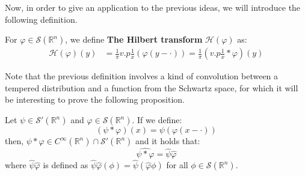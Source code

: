Now, in order to give an application to the previous ideas, we will introduce the following definition.
\begin{definition}{}
  For $\varphi\in\mathcal{S}(\mathbb{R}^n)$, we define \textbf{The Hilbert transform} $\mathcal{H}(\varphi)$ as:
  \begin{align*}
    \mathcal{H}(\varphi)(y)&=\frac{1}{\pi}v.p\frac{1}{x}(\varphi(y-\cdot))=\frac{1}{\pi}(v.p\frac{1}{x}*\varphi)(y)
  \end{align*}
\end{definition}
Note that the previous definition involves a kind of convolution between a tempered distribution and a function from the Schwartz space, for which it will be interesting to prove the following proposition.
\begin{proposition}{}
  Let $\psi\in\mathcal{S}'(\mathbb{R}^n)$ and $\varphi\in\mathcal{S}(\mathbb{R}^n)$. If we define:
  $$(\psi*\varphi)(x)=\psi(\varphi(x-\cdot))$$
  then, $\psi*\varphi\in C^{\infty}(\mathbb{R}^n)\cap\mathcal{S}'(\mathbb{R}^n)$ and it holds that:
  $$\hat{\psi*\varphi}=\hat{\psi}\hat{\varphi}$$
  where $\hat{\psi}\hat{\varphi}$ is defined as $\hat{\psi}\hat{\varphi}(\phi)=\hat{\psi}(\hat{\varphi}\phi)$ for all $\phi\in\mathcal{S}(\mathbb{R}^n)$.
\end{proposition}{}
